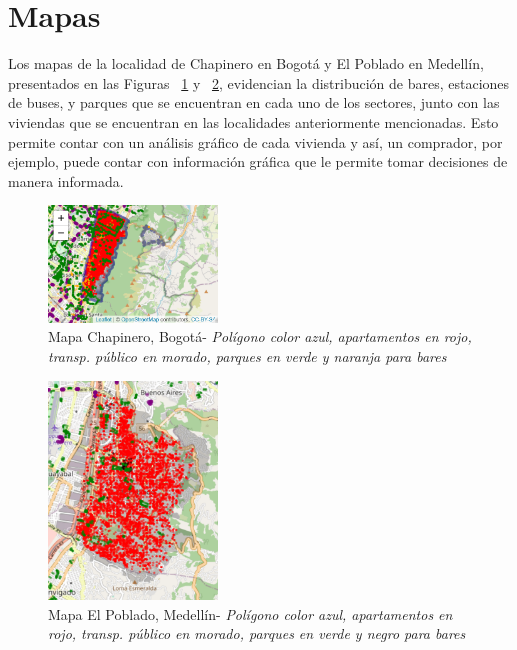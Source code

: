 \documentclass[conference, 10pt]{IEEEtran}
\begin{document}
\section{Mapas}
Los  mapas de la localidad de Chapinero en Bogotá y El Poblado en Medellín, presentados en las Figuras ~\ref{fig_1} y ~\ref{fig_2}, evidencian la distribución de bares, estaciones de buses, y parques que se encuentran en cada uno de los sectores, junto con las viviendas que se encuentran en las localidades anteriormente mencionadas. Esto permite contar con un análisis gráfico de cada vivienda y así, un comprador, por ejemplo, puede contar con información gráfica que le permite tomar decisiones de manera informada.
\begin{figure}[htbp]
\centerline{\includegraphics[width=0.4\textwidth]{../Vistas/Mapa_Chapinero_2.2.png}}
\caption{Mapa Chapinero, Bogotá- \textit{Polígono color azul, apartamentos en rojo, transp. público en morado, parques en verde y naranja para bares}}
\label{fig_1}
\end{figure}

\begin{figure}[htbp]
\centerline{\includegraphics[width=0.4\textwidth]{../Vistas/MapaPoblado1.png}}
\caption{Mapa El Poblado, Medellín- \textit{Polígono color azul, apartamentos en rojo, transp. público en morado, parques en verde y negro para bares}}
\label{fig_2}
\end{figure}
\end{document}
